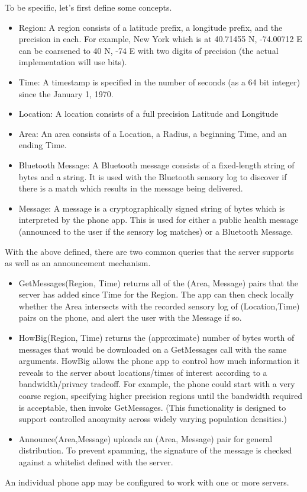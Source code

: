 \documentclass{article}
\begin{document}
To be specific, let's first define some concepts.
\begin{itemize}
    \item Region: A region consists of a latitude prefix, a longitude prefix, and the precision in each.  For example, New York which is at 40.71455 N, -74.00712 E can be coarsened to 40 N, -74 E with two digits of precision (the actual implementation will use bits).
    \item Time: A timestamp is specified in the number of seconds (as a 64 bit integer) since the January 1, 1970. 
    \item Location: A location consists of a full precision Latitude and Longitude
    \item Area: An area consists of a Location, a Radius, a beginning Time, and an ending Time.
    \item Bluetooth Message: A Bluetooth message consists of a fixed-length string of bytes and a string.  It is used with the Bluetooth sensory log to discover if there is a match which results in the message being delivered.  
    \item Message: A message is a cryptographically signed string of bytes which is interpreted by the phone app. This is used for either a public health message (announced to the user if the sensory log matches) or a Bluetooth Message. 
\end{itemize}

With the above defined, there are two common queries that the server supports as well as an announcement mechanism.
\begin{itemize}
    \item GetMessages(Region, Time) returns all of the (Area, Message) pairs that the server has added since Time for the Region. The app can then check locally whether the Area intersects with the recorded sensory log of (Location,Time) pairs on the phone, and alert the user with the Message if so.   
    \item HowBig(Region, Time) returns the (approximate) number of bytes worth of messages that would be downloaded on a GetMessages call with the same arguments.  HowBig allows the phone app to control how much information it reveals to the server about locations/times of interest according to a bandwidth/privacy tradeoff.  For example, the phone could start with a very coarse region, specifying higher precision regions until the bandwidth required is acceptable, then invoke GetMessages.  (This functionality is designed to support controlled anonymity across widely varying population densities.)
    \item Announce(Area,Message) uploads an (Area, Message) pair for general distribution.  To prevent spamming, the signature of the message is checked against a whitelist defined with the server. 
\end{itemize}
An individual phone app may be configured to work with one or more servers.
\end{document}
